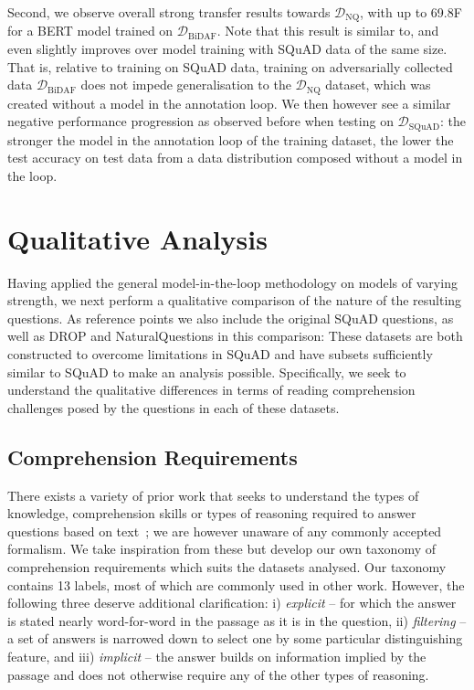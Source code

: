 \documentclass[11pt,a4paper]{article}
\newcommand{\dataset}[1]{\ensuremath{\mathcal{D_{\mathrm{#1}}}}}
\newcommand{\squad}{SQuAD}
\newcommand{\drop}{DROP}
\newcommand{\naturalquestions}{NaturalQuestions}
\newif\ifpagebreaks
\newif\ifarxiv
\begin{document}
\ifpagebreaks
    \pagebreak
\fi
Second, we observe overall strong transfer results towards \dataset{NQ}, with up to 69.8F for a BERT model trained on \dataset{BiDAF}.
Note that this result is similar to, and even slightly improves over model training with \squad{} data of the same size.
That is, relative to training on SQuAD data, training on adversarially collected data \dataset{BiDAF} does not impede generalisation to the \dataset{NQ} dataset, which was created without a model in the annotation loop.
We then however see a similar negative performance progression as observed before when testing on \dataset{SQuAD}: the stronger the model in the annotation loop of the training dataset, the lower the test accuracy on test data from a data distribution composed without a model in the loop.



\section{Qualitative Analysis} \label{sec:qualitative}
Having applied the general model-in-the-loop methodology on models of varying strength, we next perform a qualitative comparison of the nature of the resulting questions.
As reference points we also include the original \squad{} questions, as well as \drop{} and \naturalquestions{} in this comparison: These datasets are both constructed to overcome limitations in \squad{} and have subsets sufficiently similar to \squad{} to make an analysis possible.
Specifically, we seek to understand the qualitative differences in terms of reading comprehension challenges posed by the questions in each of these datasets.


\subsection{Comprehension Requirements}
There exists a variety of prior work that seeks to understand the types of knowledge, comprehension skills or types of reasoning required to answer questions based on text~\cite{rajpurkar2016squad,clark2018think,sugawara2020assessing,dua2019drop,dasigi-etal-2019-quoref}; we are however unaware of any commonly accepted formalism.
We take inspiration from these but develop our own taxonomy of comprehension requirements which suits the datasets analysed\ifarxiv, see Appendix~\ref{sec:appendix_reasoning_types} for a detailed breakdown and examples of our annotation catalogue\fi.
{\ifarxiv}{\else}
Our taxonomy contains 13 labels, most of which are commonly used in other work.
However, the following three deserve additional clarification:
i) \textit{explicit} -- for which the answer is stated nearly word-for-word in the passage as it is in the question,
ii) \textit{filtering} -- a set of answers is narrowed down to select one by some particular distinguishing feature, and
iii) \textit{implicit} -- the answer builds on information implied by the passage and does not otherwise require any of the other types of reasoning.
{\fi}
\end{document}
